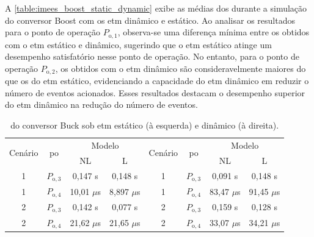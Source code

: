 A \autoref{table:imees_boost_static_dynamic} exibe as médias dos  durante a simulação do conversor Boost com os \acrshort{etm} dinâmico e estático. Ao analisar os resultados para o ponto de operação $P_{\mathrm{o}, 1}$, observa-se uma diferença mínima entre os  obtidos com o \acrshort{etm} estático e dinâmico, sugerindo que o \acrshort{etm} estático atinge um desempenho satisfatório nesse ponto de operação. No entanto, para o ponto de operação $P_{\mathrm{o}, 2}$, os  obtidos com o \acrshort{etm} dinâmico são consideravelmente maiores do que os do \acrshort{etm} estático, evidenciando a capacidade do \acrshort{etm} dinâmico em reduzir o número de eventos acionados. Esses resultados destacam o desempenho superior do \acrshort{etm} dinâmico na redução do número de eventos.

\vspace{12pt}
\begin{table}[H]
  \centering
  \captionsetup{justification=centering}
  \setlength{\tabcolsep}{10pt}
  \begin{tabular}{cccccccc}
    \toprule
    \multirow{2}{*}{\centering Cenário} & \multirow{2}{*}{\centering \acrshort{po}} & \multicolumn{2}{c}{\centering Modelo} & \multirow{2}{*}{\centering Cenário} & \multirow{2}{*}{\centering \acrshort{po}} & \multicolumn{2}{c}{\centering Modelo}                     \\
    \cmidrule(lr){3-4} \cmidrule(lr){7-8}                      &                                           & NL                                    & L                                   &                                           &                                       & NL      & L       \\
    \midrule
    1  & $P_{\mathrm{o}, 3}$                                  & 0,147 s                               & 0,148 s      &
    1   & $P_{\mathrm{o}, 3}$                                 & 0,091 s                               & 0,148 s      \\
    1  & $P_{\mathrm{o}, 4}$                                  & 10,01 $\mu$s                    & 8,897 $\mu$s & 
    1   & $P_{\mathrm{o}, 4}$                                 & 83,47 $\mu$s                          & 91,45 $\mu$s \\
    2  & $P_{\mathrm{o}, 3}$                                  & 0,142 s                               & 0,077 s      &
    2   & $P_{\mathrm{o}, 3}$                                 & 0,159 s                               & 0,128 s      \\
    2   & $P_{\mathrm{o}, 4}$                                 & 21,62 $\mu$s                          & 21,65 $\mu$s &
      2 & $P_{\mathrm{o}, 4}$                                    & 33,07 $\mu$s                          & 34,21 $\mu$s \\
    \bottomrule
  \end{tabular}
  \caption{ do conversor Buck sob \acrshort{etm} estático (à esquerda) e dinâmico (à direita).}
  \label{table:imees_boost_static_dynamic}
\end{table}

